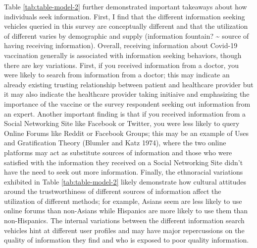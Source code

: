 Table \ref{tab:table-model-2} further demonstrated important takeaways about
how individuals seek information. First, I find that the different information
seeking vehicles queried in this survey are conceptually different and that the
utilization of different varies by demographic and supply (information fountain?
\textasciitilde{} source of having receiving information). Overall, receiving information about
Covid-19 vaccination generally is associated with information seeking behaviors,
though there are key variations. First, if you received information from a
doctor, you were likely to search from information from a doctor; this may
indicate an already existing trusting relationship between patient and
healthcare provider but it may also indicate the healthcare provider taking
initiaive and emphasizing the importance of the vaccine or the survey respondent
seeking out information from an expert. Another important finding is that if you
received information from a Social Networking Site like Facebook or Twitter, you
were less likely to query Online Forums like Reddit or Facebook Groups; this may
be an example of Uses and Gratification Theory
(Blumler and Katz 1974), where the two online platforms may act as
substitute sources of information and those who were satisfied with the
information they received on a Social Networking Site didn't have the need to
seek out more information. Finally, the ethnoracial variations exhibited in
Table \ref{tab:table-model-2} likely demonstrate how cultural attitudes around
the trustworthiness of different sources of information affect the utilization
of different methods; for example, Asians seem are less likely to use online
forums than non-Asians while Hispanics are more likely to use them than
non-Hispanics. The internal variations between the different information search
vehicles hint at different user profiles and may have major repercussions on the
quality of information they find and who is exposed to poor quality information.

